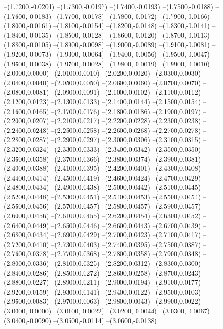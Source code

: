 	--(1.7200,-0.0201)
	--(1.7300,-0.0197)
	--(1.7400,-0.0193)
	--(1.7500,-0.0188)
	--(1.7600,-0.0183)
	--(1.7700,-0.0178)
	--(1.7800,-0.0172)
	--(1.7900,-0.0166)
	--(1.8000,-0.0161)
	--(1.8100,-0.0154)
	--(1.8200,-0.0148)
	--(1.8300,-0.0141)
	--(1.8400,-0.0135)
	--(1.8500,-0.0128)
	--(1.8600,-0.0120)
	--(1.8700,-0.0113)
	--(1.8800,-0.0105)
	--(1.8900,-0.0098)
	--(1.9000,-0.0089)
	--(1.9100,-0.0081)
	--(1.9200,-0.0073)
	--(1.9300,-0.0064)
	--(1.9400,-0.0056)
	--(1.9500,-0.0047)
	--(1.9600,-0.0038)
	--(1.9700,-0.0028)
	--(1.9800,-0.0019)
	--(1.9900,-0.0010)
	--(2.0000,0.0000)
	--(2.0100,0.0010)
	--(2.0200,0.0020)
	--(2.0300,0.0030)
	--(2.0400,0.0040)
	--(2.0500,0.0050)
	--(2.0600,0.0060)
	--(2.0700,0.0070)
	--(2.0800,0.0081)
	--(2.0900,0.0091)
	--(2.1000,0.0102)
	--(2.1100,0.0112)
	--(2.1200,0.0123)
	--(2.1300,0.0133)
	--(2.1400,0.0144)
	--(2.1500,0.0154)
	--(2.1600,0.0165)
	--(2.1700,0.0176)
	--(2.1800,0.0186)
	--(2.1900,0.0197)
	--(2.2000,0.0207)
	--(2.2100,0.0217)
	--(2.2200,0.0228)
	--(2.2300,0.0238)
	--(2.2400,0.0248)
	--(2.2500,0.0258)
	--(2.2600,0.0268)
	--(2.2700,0.0278)
	--(2.2800,0.0287)
	--(2.2900,0.0297)
	--(2.3000,0.0306)
	--(2.3100,0.0315)
	--(2.3200,0.0324)
	--(2.3300,0.0333)
	--(2.3400,0.0342)
	--(2.3500,0.0350)
	--(2.3600,0.0358)
	--(2.3700,0.0366)
	--(2.3800,0.0374)
	--(2.3900,0.0381)
	--(2.4000,0.0388)
	--(2.4100,0.0395)
	--(2.4200,0.0401)
	--(2.4300,0.0408)
	--(2.4400,0.0414)
	--(2.4500,0.0419)
	--(2.4600,0.0424)
	--(2.4700,0.0429)
	--(2.4800,0.0434)
	--(2.4900,0.0438)
	--(2.5000,0.0442)
	--(2.5100,0.0445)
	--(2.5200,0.0448)
	--(2.5300,0.0451)
	--(2.5400,0.0453)
	--(2.5500,0.0454)
	--(2.5600,0.0456)
	--(2.5700,0.0457)
	--(2.5800,0.0457)
	--(2.5900,0.0457)
	--(2.6000,0.0456)
	--(2.6100,0.0455)
	--(2.6200,0.0454)
	--(2.6300,0.0452)
	--(2.6400,0.0449)
	--(2.6500,0.0446)
	--(2.6600,0.0443)
	--(2.6700,0.0439)
	--(2.6800,0.0434)
	--(2.6900,0.0429)
	--(2.7000,0.0423)
	--(2.7100,0.0417)
	--(2.7200,0.0410)
	--(2.7300,0.0403)
	--(2.7400,0.0395)
	--(2.7500,0.0387)
	--(2.7600,0.0378)
	--(2.7700,0.0368)
	--(2.7800,0.0358)
	--(2.7900,0.0348)
	--(2.8000,0.0336)
	--(2.8100,0.0325)
	--(2.8200,0.0312)
	--(2.8300,0.0300)
	--(2.8400,0.0286)
	--(2.8500,0.0272)
	--(2.8600,0.0258)
	--(2.8700,0.0243)
	--(2.8800,0.0227)
	--(2.8900,0.0211)
	--(2.9000,0.0194)
	--(2.9100,0.0177)
	--(2.9200,0.0159)
	--(2.9300,0.0141)
	--(2.9400,0.0122)
	--(2.9500,0.0103)
	--(2.9600,0.0083)
	--(2.9700,0.0063)
	--(2.9800,0.0043)
	--(2.9900,0.0022)
	--(3.0000,-0.0000)
	--(3.0100,-0.0022)
	--(3.0200,-0.0044)
	--(3.0300,-0.0067)
	--(3.0400,-0.0090)
	--(3.0500,-0.0114)
	--(3.0600,-0.0138)
